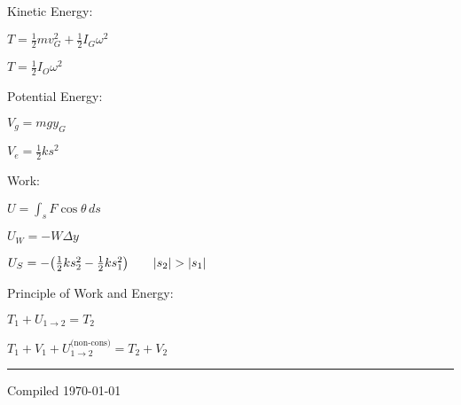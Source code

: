 \documentclass[10pt]{article}
\newcommand{\tab}{\hspace{.02\textwidth}}
\renewcommand{\d}{\,d}
\newcommand{\lrb}[1]{\left(#1\right)}
\newcommand{\abs}[1]{\left|#1\right|}
\let\originalleft\left
\let\originalright\right
\renewcommand{\left}{\mathopen{}\mathclose\bgroup\originalleft}
\renewcommand{\right}{\aftergroup\egroup\originalright}
\begin{document}
\begin{multicols*}{3}
Kinetic Energy:

\tab $T=\frac 12mv_G^2+\frac 12I_G\omega^2$

\tab $T=\frac 12I_O\omega^2$

Potential Energy:

\tab $V_g=mgy_G$

\tab $V_e=\frac 12ks^2$

Work:

\tab $U=\int_s F\cos\theta\d s$

\tab $U_W=-W\Delta y$

\tab $U_S=-\lrb{\frac 12ks_2^2-\frac 12ks_1^2}\qquad \abs{s_2}>\abs{s_1}$

Principle of Work and Energy:

\tab $T_1+U_{1\rightarrow 2}=T_2$

\tab $T_1+V_1+U_{1\rightarrow 2}^{\text{(non-cons)}}=T_2+V_2$

\rule{\linewidth}{0.1pt}

{\scriptsize 
Compiled \today}

\end{multicols*}
\end{document}
